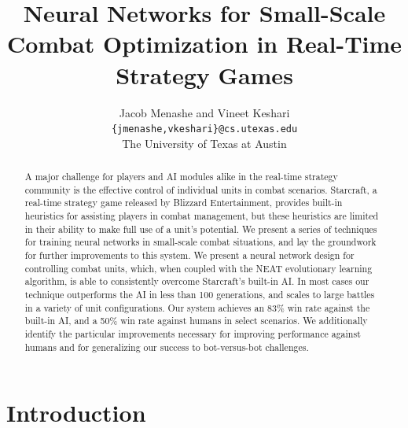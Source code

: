 \documentclass[10pt,a4paper,twocolumn]{article}
\begin{document}
\title{Neural Networks for Small-Scale Combat Optimization in Real-Time Strategy Games}
\author{Jacob Menashe and Vineet Keshari \\ \texttt{\{jmenashe,vkeshari\}@cs.utexas.edu} \\ The University of Texas at Austin}
\maketitle

\begin{abstract}
A major challenge for players and AI modules alike in the real-time strategy community is the effective control of individual units in combat scenarios. Starcraft, a real-time strategy game released by Blizzard Entertainment, provides built-in heuristics for assisting players in combat management, but these heuristics are limited in their ability to make full use of a unit's potential. We present a series of techniques for training neural networks in small-scale combat situations, and lay the groundwork for further improvements to this system. We present a neural network design for controlling combat units, which, when coupled with the NEAT evolutionary learning algorithm, is able to consistently overcome Starcraft's built-in AI. In most cases our technique outperforms the AI in less than 100 generations, and scales to large battles in a variety of unit configurations. Our system achieves an 83\% win rate against the built-in AI, and a 50\% win rate against humans in select scenarios. We additionally identify the particular improvements necessary for improving performance against humans and for generalizing our success to bot-versus-bot challenges.
\end{abstract}

\section{Introduction}
\end{document}

